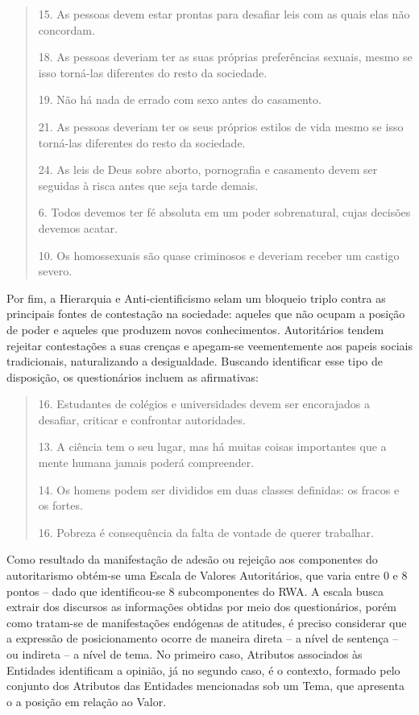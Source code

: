 \documentclass[
12pt,				%
openright,			%
twoside,			%
a4paper,			%
english,			%
french,				%
spanish,			%
brazil				%
]{abntex2}
\begin{document}
\begin{quote}
	
	15. As pessoas devem estar prontas para desafiar leis com as quais elas não concordam.
	
	
	18. As pessoas deveriam ter as suas próprias preferências sexuais, mesmo se isso torná-las diferentes do resto da sociedade.
	
	19. Não há nada de errado com sexo antes do casamento.
	
	21. As pessoas deveriam ter os seus próprios estilos de vida mesmo se isso torná-las diferentes do resto da sociedade.
	
	24. As leis de Deus sobre aborto, pornografia e casamento devem ser seguidas à risca antes que seja tarde demais.
	
	6. Todos devemos ter fé absoluta em um poder sobrenatural, cujas decisões devemos acatar.
	
	10. Os homossexuais são quase criminosos e deveriam receber um castigo severo.
	
	\cite{vilanova2018adaptaccao, de2018analises}
	
\end{quote}

Por fim, a Hierarquia e Anti-cientificismo selam um bloqueio triplo contra as principais fontes de contestação na sociedade: aqueles que não ocupam a posição de poder e aqueles que produzem novos conhecimentos. Autoritários tendem rejeitar contestações a suas crenças e apegam-se veementemente aos papeis sociais tradicionais, naturalizando a desigualdade. Buscando identificar esse tipo de disposição, os questionários incluem as afirmativas:
 
\begin{quote}
	
	16. Estudantes de colégios e universidades devem ser encorajados a desafiar, criticar e confrontar autoridades.
	
	13. A ciência tem o seu lugar, mas há muitas coisas importantes que a mente humana jamais poderá compreender.
	
	14. Os homens podem ser divididos  em duas classes definidas:  os fracos e os fortes.
	
	16. Pobreza é consequência da falta de vontade de querer trabalhar.
	
	\cite{vilanova2018adaptaccao, de2018analises}
	
\end{quote}

Como resultado da manifestação de adesão ou rejeição aos componentes do autoritarismo obtém-se uma Escala de Valores Autoritários, que varia entre 0 e 8 pontos -- dado que identificou-se 8 subcomponentes do RWA. A escala busca extrair dos discursos as informações obtidas por meio dos questionários, porém como tratam-se de manifestações endógenas de atitudes, é preciso considerar que a expressão de posicionamento ocorre de maneira direta -- a nível de sentença -- ou indireta -- a nível de tema. No primeiro caso, Atributos associados às Entidades identificam a opinião, já no segundo caso, é o contexto, formado pelo conjunto dos Atributos das Entidades mencionadas sob um Tema, que apresenta o a posição em relação ao Valor. 
\end{document}
